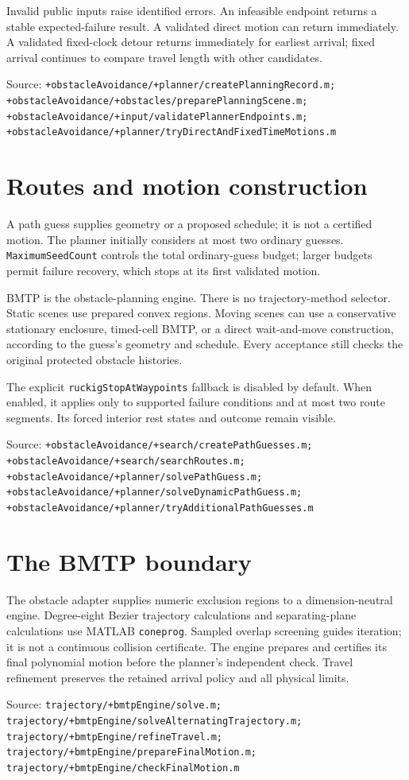 \documentclass[10pt,letterpaper]{article}
\newcommand{\source}[1]{\par{\footnotesize Source: \nolinkurl{#1}}\par}
\begin{document}
Invalid public inputs raise identified errors. An infeasible endpoint returns a
stable expected-failure result. A validated direct motion can return immediately.
A validated fixed-clock detour returns immediately for earliest arrival; fixed
arrival continues to compare travel length with other candidates.
\source{+obstacleAvoidance/+planner/createPlanningRecord.m; +obstacleAvoidance/+obstacles/preparePlanningScene.m; +obstacleAvoidance/+input/validatePlannerEndpoints.m; +obstacleAvoidance/+planner/tryDirectAndFixedTimeMotions.m}

\section{Routes and motion construction}

A path guess supplies geometry or a proposed schedule; it is not a certified
motion. The planner initially considers at most two ordinary guesses.
\texttt{MaximumSeedCount} controls the total ordinary-guess budget; larger
budgets permit failure recovery, which stops at its first validated motion.

BMTP is the obstacle-planning engine. There is no trajectory-method selector.
Static scenes use prepared convex regions. Moving scenes can use a conservative
stationary enclosure, timed-cell BMTP, or a direct wait-and-move construction,
according to the guess's geometry and schedule. Every acceptance still checks
the original protected obstacle histories.

The explicit \texttt{ruckigStopAtWaypoints} fallback is disabled by default.
When enabled, it applies only to supported failure conditions and at most two
route segments. Its forced interior rest states and outcome remain visible.
\source{+obstacleAvoidance/+search/createPathGuesses.m; +obstacleAvoidance/+search/searchRoutes.m; +obstacleAvoidance/+planner/solvePathGuess.m; +obstacleAvoidance/+planner/solveDynamicPathGuess.m; +obstacleAvoidance/+planner/tryAdditionalPathGuesses.m}

\section{The BMTP boundary}

The obstacle adapter supplies numeric exclusion regions to a dimension-neutral
engine. Degree-eight Bezier trajectory calculations and separating-plane
calculations use MATLAB \texttt{coneprog}. Sampled overlap screening guides
iteration; it is not a continuous collision certificate. The engine prepares
and certifies its final polynomial motion before the planner's independent check.
Travel refinement preserves the retained arrival policy and all physical limits.
\source{trajectory/+bmtpEngine/solve.m; trajectory/+bmtpEngine/solveAlternatingTrajectory.m; trajectory/+bmtpEngine/refineTravel.m; trajectory/+bmtpEngine/prepareFinalMotion.m; trajectory/+bmtpEngine/checkFinalMotion.m}
\end{document}
